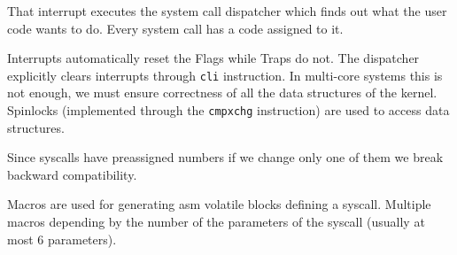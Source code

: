\documentclass[twoside]{article}
\begin{document}
That interrupt executes the system call dispatcher which finds out what the user code wants to do. Every system call has a code assigned to it.

Interrupts automatically reset the Flags while Traps do not. The dispatcher explicitly clears interrupts through \texttt{cli} instruction. In multi-core systems this is not enough, we must ensure correctness of all the data structures of the kernel. Spinlocks (implemented through the \texttt{cmpxchg} instruction) are used to access data structures.

Since syscalls have preassigned numbers if we change only one of them we break backward compatibility.

Macros are used for generating asm volatile blocks defining a syscall. Multiple macros depending by the number of the parameters of the syscall (usually at most 6 parameters).

\newpage


\end{document}
